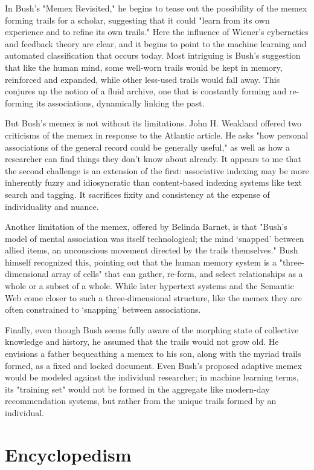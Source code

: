 In Bush's "Memex Revisited," he begins to tease out the possibility of the memex forming trails for a scholar, suggesting that it could "learn from its own experience and to refine its own trails."  Here the influence of Wiener's cybernetics and feedback theory are clear, and it begins to point to the machine learning and automated classification that occurs today. Most intriguing is Bush's suggestion that like the human mind, some well-worn trails would be kept in memory, reinforced and expanded, while other less-used trails would fall away. This conjures up the notion of a fluid archive, one that is constantly forming and re-forming its associations, dynamically linking the past.

But Bush's memex is not without its limitations. John H. Weakland offered two criticisms of the memex in response to the Atlantic article. He asks "how personal associations of the general record could be generally useful," as well as how a researcher can find things they don't know about already.  It appears to me that the second challenge is an extension of the first: associative indexing may be more inherently fuzzy and idiosyncratic than content-based indexing systems like text search and tagging. It sacrifices fixity and consistency at the expense of individuality and nuance.

Another limitation of the memex, offered by Belinda Barnet, is that "Bush's model of mental association was itself technological; the mind ‘snapped' between allied items, an unconscious movement directed by the trails themselves."  Bush himself recognized this, pointing out that the human memory system is a "three-dimensional array of cells" that can gather, re-form, and select relationships as a whole or a subset of a whole.  While later hypertext systems and the Semantic Web come closer to such a three-dimensional structure, like the memex they are often constrained to ‘snapping' between associations.

Finally, even though Bush seems fully aware of the morphing state of collective knowledge and history, he assumed that the trails would not grow old. He envisions a father bequeathing a memex to his son, along with the myriad trails formed, as a fixed and locked document. Even Bush's proposed adaptive memex would be modeled against the individual researcher; in machine learning terms, its "training set" would not be formed in the aggregate like modern-day recommendation systems, but rather from the unique trails formed by an individual.

\section{Encyclopedism}

